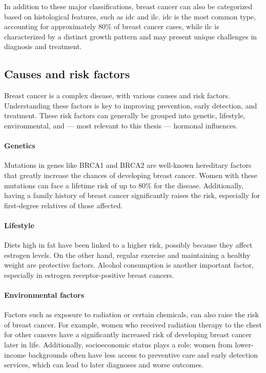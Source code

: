 In addition to these major classifications, breast cancer can also be
categorized based on histological features, such as \gls{idc} and \gls{ilc}.
\Gls{idc} is the most common type, accounting for approximately 80\% of breast
cancer cases, while \gls{ilc} is characterized by a distinct growth pattern and
may present unique challenges in diagnosis and
treatment\supercite{mittal_molecular_nodate}.

\subsection{Causes and risk factors}
\label{sec:brca_risk-factors}

Breast cancer is a complex disease, with various causes and risk factors.
Understanding these factors is key to improving prevention, early detection,
and treatment.
These risk factors can generally be grouped into genetic, lifestyle,
environmental, and — most relevant to this thesis — hormonal
influences\supercite{clusan_basic_2023}.

\paragraph{Genetics}
Mutations in genes like BRCA1 and BRCA2 are well-known hereditary factors that
greatly increase the chances of developing breast cancer.
Women with these mutations can face a lifetime risk of up to 80\% for the
disease\supercite{jian_clinical_2017}.
Additionally, having a family history of breast cancer significantly raises the
risk, especially for first-degree relatives of those
affected\supercite{schairer_risk_2013}.

\paragraph{Lifestyle}
Diets high in fat have been linked to a higher risk, possibly because they
affect estrogen levels\supercite{turner_meta-analysis_2011}.
On the other hand, regular exercise and maintaining a healthy weight are
protective factors\supercite{claudia_admoun_etiology_2022}.
Alcohol consumption is another important factor, especially in estrogen
receptor-positive breast cancers\supercite{bao_association_2011}.

\paragraph{Environmental factors}
Factors such as exposure to radiation or certain chemicals, can also raise the
risk of breast cancer.
For example, women who received radiation therapy to the chest for other
cancers have a significantly increased risk of developing breast cancer later
in life\supercite{froes_brandao_prolactin_2016}.
Additionally, socioeconomic status plays a role: women from lower-income
backgrounds often have less access to preventive care and early detection
services, which can lead to later diagnoses and worse
outcomes\supercite{cunningham_mind_2013}.

